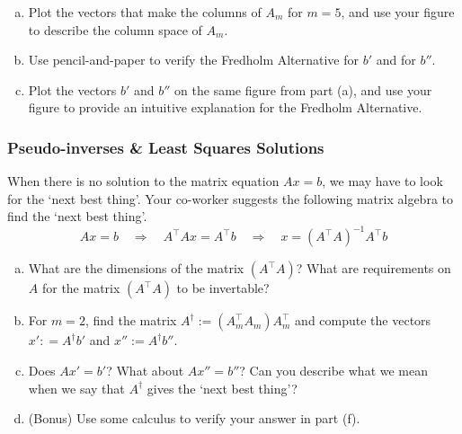 \begin{enumerate}[(a)]
    \item Plot the vectors that make the columns of $A_m$ for $m = 5$, and use your figure to describe the column space of $A_m$.
    \item Use pencil-and-paper to verify the Fredholm Alternative for $b'$ and for $b''$.
    \item Plot the vectors $b'$ and $b''$ on the same figure from part (a), and use your figure to provide an intuitive explanation for the Fredholm Alternative.
\end{enumerate}


\subsubsection*{Pseudo-inverses \& Least Squares Solutions}
When there is no solution to the matrix equation $Ax = b$, we may have to look for the `next best thing'. Your co-worker suggests the following matrix algebra to find the `next best thing'.
\begin{equation*}
Ax = b \quad \Rightarrow \quad A^\top A x = A^\top b \quad \Rightarrow \quad x = (A^\top A)^{-1} A^\top b
\end{equation*}
\begin{enumerate}[(a), resume]
    \item What are the dimensions of the matrix $(A^\top A)$? What are requirements on $A$ for the matrix $(A^\top A)$ to be invertable?
    \item For $m = 2$, find the matrix $A^\dagger:=(A_m^\top A_m) A_m^\top$ and compute the vectors $x': = A^\dagger b'$ and $x'':=A^\dagger b''$.
    \item Does $Ax' = b'$? What about $Ax'' = b''$? Can you describe what we mean when we say that $A^\dagger$ gives the `next best thing'?
    \item (Bonus) Use some calculus to verify your answer in part (f).
\end{enumerate}

